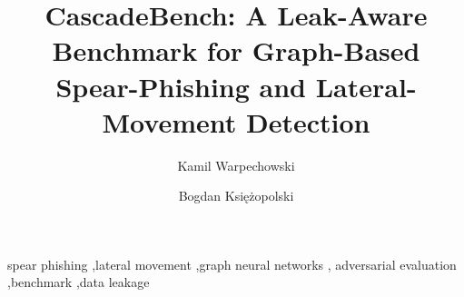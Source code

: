 \documentclass[final,5p,times]{elsarticle}
\begin{document}
\begin{frontmatter}

\title{CascadeBench: A Leak-Aware Benchmark for Graph-Based\\
Spear-Phishing and Lateral-Movement Detection}

\author[koz]{Kamil Warpechowski}
\author[koz,nask]{Bogdan Ksi\k{e}\.zopolski}

\address[koz]{Kozminski University, Jagiello\'nska 57/59, 03-301 Warsaw, Poland}
\address[nask]{NASK National Research Institute, Warsaw, Poland}



\begin{keyword}
spear phishing \sep lateral movement \sep graph neural networks \sep
adversarial evaluation \sep benchmark \sep data leakage
\end{keyword}

\end{frontmatter}










\end{document}
